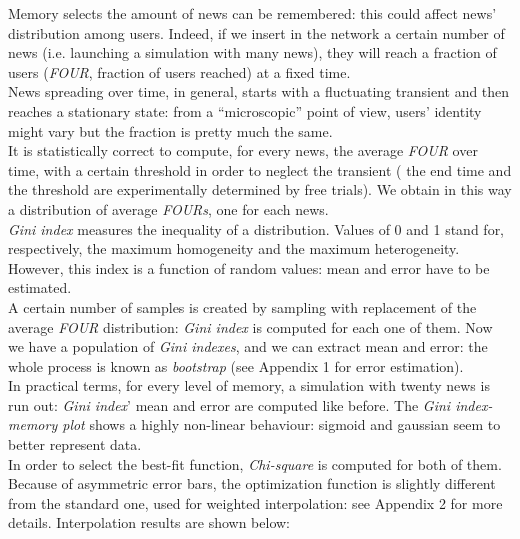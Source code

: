 
Memory selects the amount of news can be remembered: this could affect news' distribution among users.
Indeed, if we insert in the network a certain number of news (i.e. launching a simulation with many news), they will reach a fraction of users (\textit{FOUR}, fraction of users reached) at a fixed time.\\
News spreading over time, in general, starts with a fluctuating transient and then reaches a stationary state: from a ``microscopic'' point of view, users' identity might vary but the fraction is pretty much the same. \\
It is statistically correct to compute, for every news, the average \textit{FOUR} over time, with a certain threshold in order to neglect the transient ( the end time and the threshold are experimentally determined by free trials).
We obtain in this  way a distribution of average \textit{FOURs}, one for each news.\\
\textit{Gini index} \cite{ginindex} measures the inequality of a distribution. Values of 0 and 1 stand for, respectively, the maximum homogeneity and the maximum heterogeneity.
However, this index is a function of random values: mean and error have to be estimated.\\
A certain number of samples is created by sampling with replacement of the average \textit{FOUR} distribution: \textit{Gini index} is computed for each one of them.
Now we have a population of \textit{Gini indexes}, and we can extract mean and error: the whole process is known as \textit{bootstrap} \cite{bootstrap} (see Appendix 1 for error estimation).\\
In practical terms, for every level of  memory, a simulation with twenty news is run out: \textit{Gini index}' mean and error are computed like before.
The \textit{Gini index-memory plot} shows a highly non-linear behaviour: sigmoid and gaussian seem to better represent data.\\
 In order to select the best-fit function, \textit{Chi-square} is computed for both of them. \\
Because of asymmetric error bars, the optimization function is slightly different from the standard one, used for weighted interpolation: see Appendix 2 for more details.
Interpolation results are shown below:


